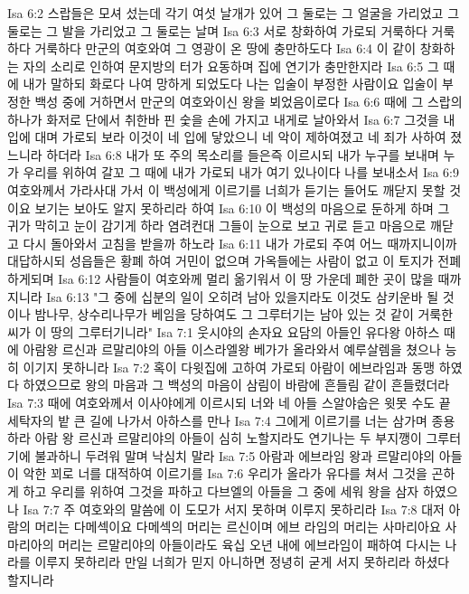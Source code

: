 Isa 6:2  스랍들은 모셔 섰는데 각기 여섯 날개가 있어 그 둘로는 그 얼굴을 가리었고 그 둘로는 그 발을 가리었고 그 둘로는 날며
Isa 6:3  서로 창화하여 가로되 거룩하다 거룩하다 거룩하다 만군의 여호와여 그 영광이 온 땅에 충만하도다
Isa 6:4  이 같이 창화하는 자의 소리로 인하여 문지방의 터가 요동하며 집에 연기가 충만한지라
Isa 6:5  그 때에 내가 말하되 화로다 나여 망하게 되었도다 나는 입술이 부정한 사람이요 입술이 부정한 백성 중에 거하면서 만군의 여호와이신 왕을 뵈었음이로다
Isa 6:6  때에 그 스랍의 하나가 화저로 단에서 취한바 핀 숯을 손에 가지고 내게로 날아와서
Isa 6:7  그것을 내 입에 대며 가로되 보라 이것이 네 입에 닿았으니 네 악이 제하여졌고 네 죄가 사하여 졌느니라 하더라
Isa 6:8  내가 또 주의 목소리를 들은즉 이르시되 내가 누구를 보내며 누가 우리를 위하여 갈꼬 그 때에 내가 가로되 내가 여기 있나이다 나를 보내소서
Isa 6:9  여호와께서 가라사대 가서 이 백성에게 이르기를 너희가 듣기는 들어도 깨닫지 못할 것이요 보기는 보아도 알지 못하리라 하여
Isa 6:10  이 백성의 마음으로 둔하게 하며 그 귀가 막히고 눈이 감기게 하라 염려컨대 그들이 눈으로 보고 귀로 듣고 마음으로 깨닫고 다시 돌아와서 고침을 받을까 하노라
Isa 6:11  내가 가로되 주여 어느 때까지니이까 대답하시되 성읍들은 황폐 하여 거민이 없으며 가옥들에는 사람이 없고 이 토지가 전폐하게되며
Isa 6:12  사람들이 여호와께 멀리 옮기워서 이 땅 가운데 폐한 곳이 많을 때까지니라
Isa 6:13  "그 중에 십분의 일이 오히려 남아 있을지라도 이것도 삼키운바 될 것이나 밤나무, 상수리나무가 베임을 당하여도 그 그루터기는 남아 있는 것 같이 거룩한 씨가 이 땅의 그루터기니라"
Isa 7:1  웃시야의 손자요 요담의 아들인 유다왕 아하스 때에 아람왕 르신과 르말리야의 아들 이스라엘왕 베가가 올라와서 예루살렘을 쳤으나 능히 이기지 못하니라
Isa 7:2  혹이 다윗집에 고하여 가로되 아람이 에브라임과 동맹 하였다 하였으므로 왕의 마음과 그 백성의 마음이 삼림이 바람에 흔들림 같이 흔들렸더라
Isa 7:3  때에 여호와께서 이사야에게 이르시되 너와 네 아들 스알야숩은 윗못 수도 끝 세탁자의 밭 큰 길에 나가서 아하스를 만나
Isa 7:4  그에게 이르기를 너는 삼가며 종용하라 아람 왕 르신과 르말리야의 아들이 심히 노할지라도 연기나는 두 부지깽이 그루터기에 불과하니 두려워 말며 낙심치 말라
Isa 7:5  아람과 에브라임 왕과 르말리야의 아들이 악한 꾀로 너를 대적하여 이르기를
Isa 7:6  우리가 올라가 유다를 쳐서 그것을 곤하게 하고 우리를 위하여 그것을 파하고 다브엘의 아들을 그 중에 세워 왕을 삼자 하였으나
Isa 7:7  주 여호와의 말씀에 이 도모가 서지 못하며 이루지 못하리라
Isa 7:8  대저 아람의 머리는 다메섹이요 다메섹의 머리는 르신이며 에브 라임의 머리는 사마리아요 사마리아의 머리는 르말리야의 아들이라도 육십 오년 내에 에브라임이 패하여 다시는 나라를 이루지 못하리라 만일 너희가 믿지 아니하면 정녕히 굳게 서지 못하리라 하셨다 할지니라
